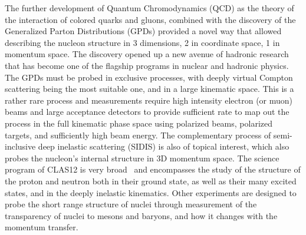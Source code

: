 \documentclass[final,3p,times,twocolumn,authoryear]{elsarticle}
\begin{document}
The further development of Quantum Chromodynamics (QCD) as the theory of the interaction of colored quarks and gluons, combined with the discovery of the Generalized Parton Distributions (GPDs) provided a novel way that allowed describing the nucleon structure in 3 dimensions, 2 in coordinate space, 1 in momentum space. The discovery opened up a new avenue of hadronic research that has become one of the flagship programs in nuclear and hadronic physics. The GPDs must be probed in exclusive processes, with deeply virtual Compton scattering being the most suitable one, and in a large kinematic space. This is a rather rare process and measurements require high intensity electron (or muon) beams and large acceptance detectors to provide sufficient rate to map out the process in the full kinematic phase space using polarized beams, polarized targets, and sufficiently high beam energy. The complementary process of semi-inclusive deep inelastic scattering (SIDIS) is also of topical interest,  which also probes the nucleon's internal structure in 3D momentum space. The science program of CLAS12 is very broad~\cite{Burkert:2018nvj} and encompasses the study of the structure of the proton and neutron both in their ground state, as well as their many excited states, and in the deeply inelastic kinematics. Other experiments are designed to probe the short range structure of nuclei through measurement of the transparency of nuclei to mesons and baryons, and how it changes with the momentum transfer.   
\end{document}
